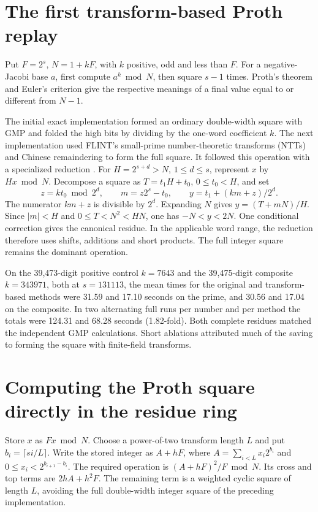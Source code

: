 \documentclass[11pt,a4paper,oneside,openany]{report}
\begin{document}
\section{The first transform-based Proth replay}
Put $F=2^s$, $N=1+kF$, with $k$ positive, odd and less than $F$. For a negative-Jacobi base $a$, first compute $a^k\bmod N$, then square $s-1$ times. Proth's theorem and Euler's criterion give the respective meanings of a final value equal to or different from $N-1$.

The initial exact implementation formed an ordinary double-width square with GMP and folded the high bits by dividing by the one-word coefficient $k$. The next implementation used FLINT's small-prime number-theoretic transforms (NTTs) and Chinese remaindering to form the full square. It followed this operation with a specialized reduction \cite{flint}. For $H=2^{s+d}>N$, $1\le d\le s$, represent $x$ by $Hx\bmod N$. Decompose a square as $T=t_1H+t_0$, $0\le t_0<H$, and set
\[
 z=kt_0\bmod 2^d,\qquad m=z2^s-t_0,\qquad
 y=t_1+(km+z)/2^d.
\]
The numerator $km+z$ is divisible by $2^d$. Expanding $N$ gives $y=(T+mN)/H$. Since $|m|<H$ and $0\le T<N^2<HN$, one has $-N<y<2N$. One conditional correction gives the canonical residue. In the applicable word range, the reduction therefore uses shifts, additions and short products. The full integer square remains the dominant operation.

On the 39,473-digit positive control $k=7643$ and the 39,475-digit composite $k=343971$, both at $s=131113$, the mean times for the original and transform-based methods were 31.59 and 17.10 seconds on the prime, and 30.56 and 17.04 on the composite. In two alternating full runs per number and per method the totals were 124.31 and 68.28 seconds (1.82-fold). Both complete residues matched the independent GMP calculations. Short ablations attributed much of the saving to forming the square with finite-field transforms.

\section{Computing the Proth square directly in the residue ring}
Store $x$ as $Fx\bmod N$. Choose a power-of-two transform length $L$ and put $b_i=\lceil si/L\rceil$. Write the stored integer as $A+hF$, where $A=\sum_{i<L}x_i2^{b_i}$ and $0\le x_i<2^{b_{i+1}-b_i}$. The required operation is $(A+hF)^2/F\bmod N$. Its cross and top terms are $2hA+h^2F$. The remaining term is a weighted cyclic square of length $L$, avoiding the full double-width integer square of the preceding implementation.
\end{document}

